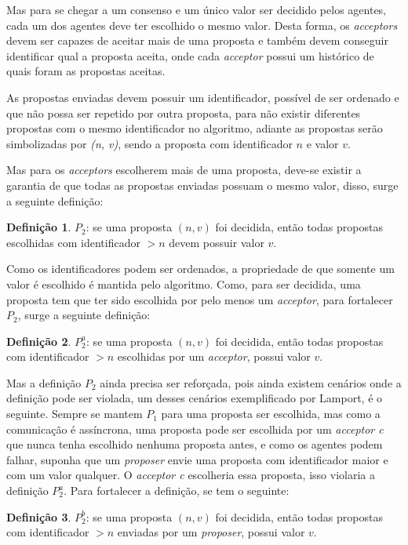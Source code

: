 \documentclass[12pt,
openright, 
oneside,
a4paper,
brazil]{facom-ufu-abntex2}
\theoremstyle{definition}
\newtheorem*{definition}{Definição}
\begin{document}
Mas para se chegar a um consenso e um único valor ser decidido pelos agentes, cada um
dos agentes deve ter escolhido o mesmo valor. Desta forma, os \textit{acceptors} devem
ser capazes de aceitar mais de uma proposta e também devem conseguir identificar qual
a proposta aceita, onde cada \textit{acceptor} possui um histórico de quais foram as
propostas aceitas.

As propostas enviadas devem possuir um identificador, possível de ser ordenado e que não 
possa ser repetido por outra proposta, para não existir diferentes propostas com o mesmo
identificador no algoritmo, adiante as propostas serão simbolizadas por 
\textit{(n, v)}, sendo a proposta com identificador $n$ e valor $v$.

Mas para os \textit{acceptors} escolherem mais de uma proposta, deve-se existir a garantia de
que todas as propostas enviadas possuam o mesmo valor, disso, surge a seguinte definição:

\begin{definition}
$P_2$: se uma proposta $(n, v)$ foi decidida, então todas propostas escolhidas com 
identificador $>n$ devem possuir valor $v$.
\end{definition}

Como os identificadores podem ser ordenados, a propriedade de que somente um valor é escolhido
é mantida pelo algoritmo. Como, para ser decidida, uma proposta tem que ter sido escolhida
por pelo menos um \textit{acceptor}, para fortalecer $P_2$, surge a seguinte definição:

\begin{definition}
$P_2^a$: se uma proposta $(n, v)$ foi decidida, então todas propostas com identificador
$>n$ escolhidas por um \textit{acceptor}, possui valor $v$.
\end{definition}

Mas a definição $P_2$ ainda precisa ser reforçada, pois ainda existem cenários onde a 
definição pode ser violada, um desses cenários exemplificado por Lamport, é o seguinte. 
Sempre se mantem $P_1$ para uma proposta ser escolhida, mas como
a comunicação é assíncrona, uma proposta pode ser escolhida por um \textit{acceptor c} 
que nunca tenha escolhido nenhuma proposta antes, e como os agentes podem falhar, suponha
que um \textit{proposer} envie uma proposta com identificador maior e com um valor qualquer.
O \textit{acceptor c} escolheria essa proposta, isso violaria a definição $P_2^a$. Para
fortalecer a definição, se tem o seguinte:

\begin{definition}
$P_2^b$: se uma proposta $(n, v)$ foi decidida, então todas propostas com identificador
$>n$ enviadas por um \textit{proposer}, possui valor $v$.
\end{definition}
\end{document}
